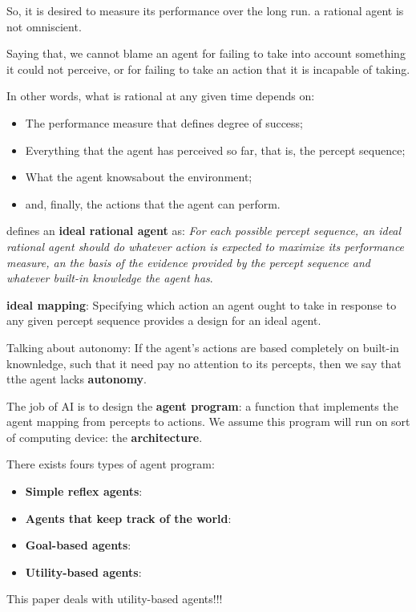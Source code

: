 So, it is desired to measure its performance over the long run.
a rational agent is not omniscient. 

Saying that, we cannot blame an agent for failing to take into account something it could not perceive, or for failing to take an action that it is incapable of taking.

In other words, what is rational at any given time depends on:
\begin{itemize}
    \item The performance measure that defines degree of success;
    \item Everything that the agent has perceived so far, that is, the percept sequence;
    \item What the agent knowsabout the environment;
    \item and, finally, the actions that the agent can perform.
\end{itemize}

\cite{ref:russell1995aima} defines an \textbf{ideal rational agent} as: \textit{For each possible percept sequence, an ideal rational agent should do whatever action is expected to maximize its performance measure, an the basis of the evidence provided by the percept sequence and whatever built-in knowledge the agent has}.

\textbf{ideal mapping}: Specifying which action an agent ought to take in response to any given percept sequence provides a design for an ideal agent.

Talking about autonomy: If the agent's actions are based completely on built-in knownledge, such that it need pay no attention to its percepts, then we say that tthe agent lacks \textbf{autonomy}.

The job of AI is to design the \textbf{agent program}: a function that implements the agent mapping from percepts to actions. We assume this program will run on sort of computing device: the \textbf{architecture}.

There exists fours types of agent program:
\begin{itemize}
    \item \textbf{Simple reflex agents}:
    \item \textbf{Agents that keep track of the world}:
    \item \textbf{Goal-based agents}:
    \item \textbf{Utility-based agents}:
\end{itemize}

This paper deals with utility-based agents!!!

